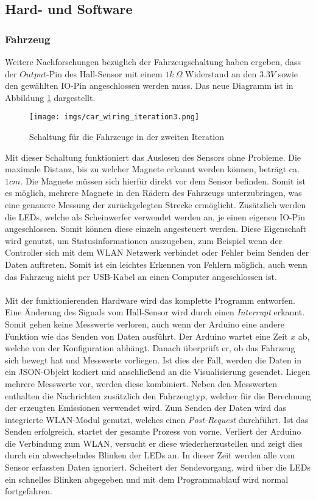 \documentclass[.../Dokumentation.tex]{subfiles}
\begin{document}
    \subsection{Hard- und Software}\label{sec-ita2-hardware}
    \subsubsection*{Fahrzeug}
    Weitere Nachforschungen bezüglich der Fahrzeugschaltung haben ergeben, dass der $Output$-Pin des Hall-Sensor mit einem $1k\ \Omega$  Widerstand an den $3.3V$ sowie den gewählten IO-Pin angeschlossen werden muss. Das neue Diagramm ist in Abbildung \ref{fig-hardware-car-iteration2} dargestellt.
       	\begin{figure}[H]
    	\begin{center}
    		\texttt{[image: imgs/car\_wiring\_iteration3.png]}
    		\caption{Schaltung für die Fahrzeuge in der zweiten Iteration }
    		\label{fig-hardware-car-iteration2}
    	\end{center}
    \end{figure}
    \noindent
    Mit dieser Schaltung funktioniert das Auslesen des Sensors ohne Probleme. Die maximale Distanz, bis zu welcher Magnete erkannt werden können, beträgt ca. $1 cm$. Die Magnete müssen sich hierfür direkt vor dem Sensor befinden. Somit ist es möglich, mehrere Magnete in den Rädern des Fahrzeugs unterzubringen, was eine genauere Messung der zurückgelegten Strecke ermöglicht. Zusätzlich werden die LEDs, welche als Scheinwerfer verwendet werden an, je einen eigenen IO-Pin angeschlossen. Somit können diese einzeln angesteuert werden. Diese Eigenschaft wird genutzt, um Statusinformationen auszugeben, zum Beispiel wenn der Controller sich mit dem WLAN Netzwerk verbindet oder Fehler beim Senden der Daten auftreten. Somit ist ein leichtes Erkennen von Fehlern möglich, auch wenn das Fahrzeug nicht per USB-Kabel an einen Computer angeschlossen ist.\\\\
    Mit der funktionierenden Hardware wird das komplette Programm entworfen. Eine Änderung des Signals vom Hall-Sensor wird durch einen \emph{Interrupt} erkannt. Somit gehen keine Messwerte verloren, auch wenn der Arduino eine andere Funktion wie das Senden von Daten ausführt. Der Arduino wartet eine Zeit $x$ ab, welche von der Konfiguration abhängt. Danach überprüft er, ob das Fahrzeug sich bewegt hat und Messwerte vorliegen. Ist dies der Fall, werden die Daten in ein JSON-Objekt kodiert und anschließend an die Visualisierung gesendet. Liegen mehrere Messwerte vor, werden diese kombiniert. Neben den Messwerten enthalten die Nachrichten zusätzlich den Fahrzeugtyp, welcher für die Berechnung der erzeugten Emissionen verwendet wird. Zum Senden der Daten wird das integrierte WLAN-Modul genutzt, welches einen \emph{Post-Request} durchführt. 
   	Ist das Senden erfolgreich, startet der gesamte Prozess von vorne. Verliert der Arduino die Verbindung zum WLAN, versucht er diese wiederherzustellen und zeigt dies durch ein abwechselndes Blinken der LEDs an. In dieser Zeit werden alle vom Sensor erfassten Daten ignoriert. Scheitert der Sendevorgang, wird über die LEDs ein schnelles  Blinken abgegeben und mit dem Programmablauf wird normal fortgefahren. 
\end{document}
